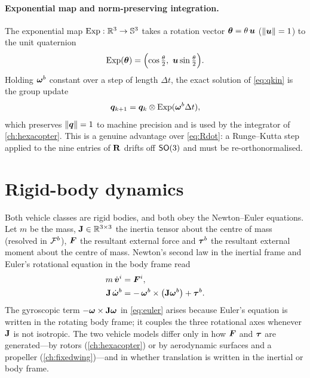 \paragraph{Exponential map and norm-preserving integration.} The exponential map
$\operatorname{Exp}:\mathbb{R}^3\to\mathbb{S}^3$ takes a rotation vector $\bm{\theta}=\theta\,\bm{u}$
($\left\lVert \bm{u} \right\rVert=1$) to the unit quaternion
\begin{equation}
\Exp(\vv{\theta})=\Bigl(\cos\tfrac{\theta}{2},\ \vv{u}\sin\tfrac{\theta}{2}\Bigr).
\label{eq:qexp}
\end{equation}
Holding $\bm{\omega}^{b}$ constant over a step of length $\Delta t$, the exact
solution of \cref{eq:qkin} is the group update
\begin{equation}
\bm{q}_{k+1}=\bm{q}_k\otimes\operatorname{Exp}(\bm{\omega}^{b}\Delta t),
\label{eq:qint}
\end{equation}
which preserves $\left\lVert \bm{q} \right\rVert=1$ to machine precision and is used by the
integrator of \cref{ch:hexacopter}. This is a genuine advantage over
\cref{eq:Rdot}: a Runge--Kutta step applied to the nine entries of $\mathbf{R}$
drifts off $\mathsf{SO}(3)$ and must be re-orthonormalised.

\section{Rigid-body dynamics}
\label{sec:rigidbody}

Both vehicle classes are rigid bodies, and both obey the Newton--Euler
equations. Let $m$ be the mass, $\mathbf{J}\in\mathbb{R}^{3\times3}$ the inertia tensor
about the centre of mass (resolved in $\mathcal{F}^{b}$), $\bm{F}$ the resultant
external force and $\bm{\tau}^{b}$ the resultant external moment about the centre
of mass. Newton's second law in the inertial frame and Euler's rotational
equation in the body frame read
\begin{align}
m\,\dot{\bm{v}}^{i} &= \bm{F}^{i}, \label{eq:newton}\\
\mathbf{J}\,\dot{\bm{\omega}}^{b} &= -\,\bm{\omega}^{b}\times\bigl(\mathbf{J}\bm{\omega}^{b}\bigr)
+\bm{\tau}^{b}. \label{eq:euler}
\end{align}
The gyroscopic term $-\bm{\omega}\times\mathbf{J}\bm{\omega}$ in \cref{eq:euler}
arises because Euler's equation is written in the rotating body frame; it couples
the three rotational axes whenever $\mathbf{J}$ is not isotropic. The two vehicle
models differ only in how $\bm{F}$ and $\bm{\tau}$ are generated---by rotors
(\cref{ch:hexacopter}) or by aerodynamic surfaces and a propeller
(\cref{ch:fixedwing})---and in whether translation is written in the inertial or
body frame.

